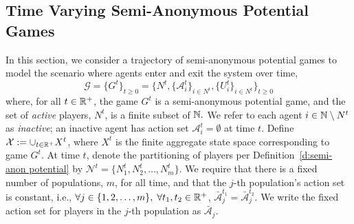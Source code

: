 \subsection{Time Varying Semi-Anonymous Potential Games}

In this section, we consider a trajectory of semi-anonymous potential games to model the scenario where agents enter and exit the system over time,
$$\mathcal{G} = \{G^t\}_{t\geq 0} =  \{N^t,\{\mathcal{A}_i^t\}_{i\in N^t},\{U_i^t\}_{i\in N^t}\}_{t\geq 0}$$
where, for all $t\in \mathbb{R}^+$, the game $G^t$ is a semi-anonymous potential game, and the set of \emph{active} players, $N^t$, is a finite subset of $\mathbb{N}.$  We refer to each agent $i\in \mathbb{N}\setminus N^t$ as \emph{inactive}; an inactive agent has action set $\mathcal{A}_i^t = \emptyset$ at time $t$. Define ${\mathcal X} :=\cup_{t\in \mathbb{R}^+}X^t$, where $X^t$ is the finite aggregate state space corresponding to game $G^t.$
At time $t$, denote the partitioning of players per Definition~\ref{d:semi-anon potential}  by $\mathcal{N}^t = \{N_1^t,N_2^t,\ldots,N_m^t\}$. We require that there is a fixed number of populations, $m$, for all time, and that the $j$-th population's action set is constant, i.e., $\forall j\in \{1,2,\ldots,m\},\;\forall t_1, t_2 \in \mathbb{R}^+$, $\bar{\mathcal{A}}^{t_1}_j = \bar{\mathcal{A}}^{t_2}_j.$ We write the fixed action set for players in the $j$-th population as  $\bar{\mathcal{A}}_j$. 


